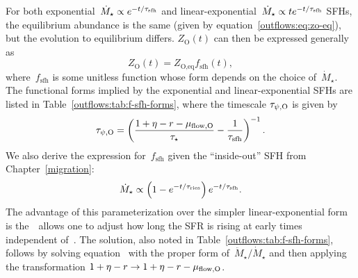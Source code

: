 For both exponential~$\dot{M}_\star \propto e^{-t / \tau_\text{sfh}}$ and
linear-exponential~$\dot{M}_\star \propto t e^{-t / \tau_\text{sfh}}$ SFHs,
the equilibrium abundance is the same (given by
equation~\ref{outflows:eq:zo-eq}), but the evolution to equilibrium differs.
$Z_\text{O}(t)$ can then be expressed generally as
\begin{equation}
Z_\text{O}(t) = Z_\text{O,eq} f_\text{sfh}(t),
\label{outflows:eq:f-sfh-definition}
\end{equation}
where~$f_\text{sfh}$ is some unitless function whose form depends on the
choice of~$\dot{M}_\star$.
The functional forms implied by the exponential and linear-exponential SFHs
are listed in Table~\ref{outflows:tab:f-sfh-forms}, where the timescale
$\tau_{\psi,\text{O}}$ is given by
\begin{equation}
\tau_{\psi,\text{O}} = \left(
\frac{1 + \eta - r - \mu_{\text{flow},\text{O}}}{\tau_\star} - \frac{1}{\tau_\text{sfh}}
\right)^{-1}.
\label{outflows:eq:tau-psi-definition}
\end{equation}
We also derive the expression for~$f_\text{sfh}$ given the ``inside-out'' SFH
from Chapter~\ref{migration}:
\begin{equation}
\dot{M}_\star \propto \left(1 - e^{-t / \tau_\text{ries}}\right)
e^{-t / \tau_\text{sfh}}.
\label{outflows:eq:inside-out-sfh}
\end{equation}
The advantage of this parameterization over the simpler linear-exponential form
is the~~allows one to adjust how long the SFR is rising at
early times independent of~.
The solution, also noted in Table~\ref{outflows:tab:f-sfh-forms}, follows by
solving equation~ with the proper form
of~$\ddot{M}_\star / \dot{M}_\star$ and then applying the transformation
$1 + \eta - r \rightarrow 1 + \eta - r - \mu_{\text{flow},\text{O}}$.





